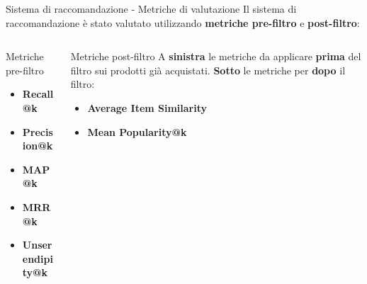 \documentclass{beamer}
\begin{document}
	\begin{frame}{Sistema di raccomandazione - Metriche di valutazione}
		Il sistema di raccomandazione è stato valutato utilizzando \textbf{metriche pre-filtro} e \textbf{post-filtro}:

		\begin{columns}
			\begin{column}{0.5\textwidth}
				\begin{exampleblock}{Metriche pre-filtro}
					\begin{itemize}
						\item \textbf{Recall@k}
						\item \textbf{Precision@k}
						\item \textbf{MAP@k}
						\item \textbf{MRR@k}
						\item \textbf{Unserendipity@k}
					\end{itemize}
				\end{exampleblock}
			\end{column}
			\begin{column}{0.5\textwidth}
				\begin{exampleblock}{Metriche post-filtro}
					A \textbf{sinistra} le metriche da applicare \textbf{prima} del filtro sui prodotti già acquistati.
					\textbf{Sotto} le metriche per \textbf{dopo} il filtro:
					\begin{itemize}
						\item \textbf{Average Item Similarity}
						\item \textbf{Mean Popularity@k}
					\end{itemize}
				\end{exampleblock}
			\end{column}
		\end{columns}
	\end{frame}
\end{document}
